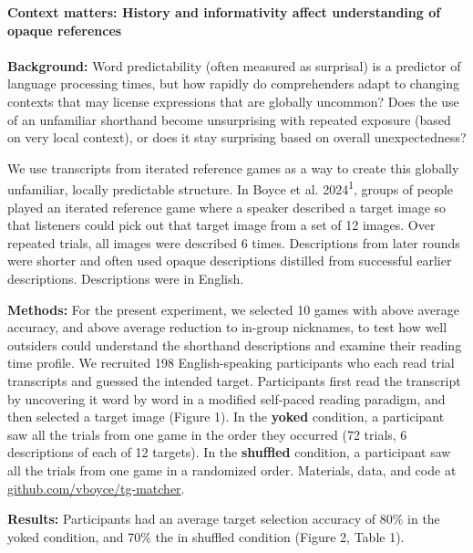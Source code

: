 \documentclass[11pt,a4paper]{article}
\renewcommand{\title}[1]{\textbf{#1}\\}
\newcommand{\authors}[1]{\iftoggle{anonymous}{\phantom{#1}}{#1}\\}
\begin{document}
\noindent\title{Context matters: History and informativity affect understanding of opaque references}
\authors{Veronica Boyce (vboyce@stanford.edu), Ben Prystawski, Alvin Tan, Michael C. Frank \\Stanford University}

\noindent\textbf{Background:} Word predictability (often measured as surprisal) is a predictor of language processing times, but how rapidly do comprehenders adapt to changing contexts that may license expressions that are globally uncommon? Does the use of an unfamiliar shorthand become unsurprising with repeated exposure (based on very local context), or does it stay surprising based on overall unexpectedness? 

 We use transcripts from iterated reference games as a way to create this globally unfamiliar, locally predictable structure. In Boyce et al. 2024\textsuperscript{1}, groups of people played an iterated reference game where a speaker described a target image so that listeners could pick out that target image from a set of 12 images. Over repeated trials, all images were described 6 times. Descriptions from later rounds were shorter and often used opaque descriptions distilled from successful earlier descriptions. Descriptions were in English. 

\smallskip

\noindent \textbf{Methods:} For the present experiment, we selected 10 games with above average accuracy, and above average reduction to in-group nicknames, to test how well outsiders could understand the shorthand descriptions and examine their reading time profile. We recruited 198 English-speaking participants who each read trial transcripts and guessed the intended target. Participants first read the transcript by uncovering it word by word in a modified self-paced reading paradigm, and then selected a target image (Figure 1). In the \textbf{yoked} condition, a participant saw all the trials from one game in the order they occurred (72 trials, 6 descriptions of each of 12 targets). In the \textbf{shuffled} condition, a participant saw all the trials from one game in a randomized order. Materials, data, and code at \url{github.com/vboyce/tg-matcher}.

\smallskip

\noindent \textbf{Results:} Participants had an average target selection accuracy of 80\% in the yoked condition, and 70\% the in shuffled condition (Figure 2, Table 1).
\end{document}
